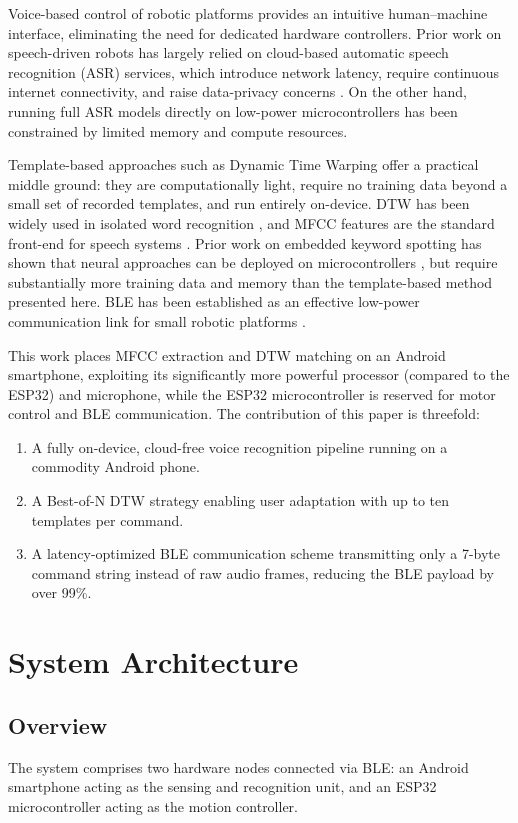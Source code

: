 \documentclass[conference]{IEEEtran}
\begin{document}
Voice-based control of robotic platforms provides an intuitive
human--machine interface, eliminating the need for dedicated hardware
controllers. Prior work on speech-driven robots has largely relied on
cloud-based automatic speech recognition (ASR) services, which
introduce network latency, require continuous internet connectivity,
and raise data-privacy concerns \cite{li2017speech}. On the other hand,
running full ASR models directly on low-power microcontrollers has been
constrained by limited memory and compute resources.

Template-based approaches such as Dynamic Time Warping offer a practical
middle ground: they are computationally light, require no training data
beyond a small set of recorded templates, and run entirely on-device.
DTW has been widely used in isolated word recognition \cite{sakoe1978dtw},
and MFCC features are the standard front-end for speech systems \cite{davis1980mfcc}.
Prior work on embedded keyword spotting has shown that neural approaches
can be deployed on microcontrollers \cite{zhang2017hello, choi2019iot}, but
require substantially more training data and memory than the template-based
method presented here. BLE has been established as an effective low-power
communication link for small robotic platforms \cite{mikhaylov2013ble}.

This work places MFCC extraction and DTW matching on an Android
smartphone, exploiting its significantly more powerful processor (compared to the ESP32) and
microphone, while the ESP32 microcontroller is reserved for motor
control and BLE communication. The contribution of this paper is
threefold:
\begin{enumerate}
  \item A fully on-device, cloud-free voice recognition pipeline running
    on a commodity Android phone.
  \item A Best-of-N DTW strategy enabling user adaptation with up to
    ten templates per command.
  \item A latency-optimized BLE communication scheme transmitting only
    a 7-byte command string instead of raw audio frames, reducing the
    BLE payload by over 99\%.
\end{enumerate}

\section{System Architecture} \label{sec:architecture}

\subsection{Overview}
The system comprises two hardware nodes connected via BLE: an Android
smartphone acting as the sensing and recognition unit, and an ESP32
microcontroller acting as the motion controller.
\end{document}
